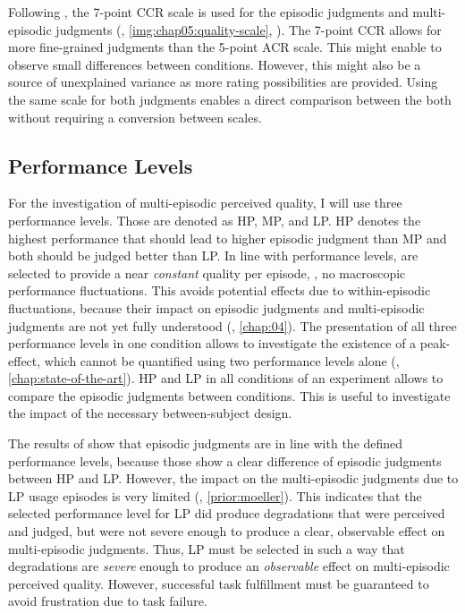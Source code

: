 Following \citet{moller_single-call_2011}, the 7-point \acf{CCR} scale is used for the episodic judgments and multi-episodic judgments (\cf, \autoref{img:chap05:quality-scale}, ).
The 7-point \ac{CCR} allows for more fine-grained judgments than the 5-point \ac{ACR} scale.
This might enable to observe small differences between conditions.
However, this might also be a source of unexplained variance as more rating possibilities are provided.
Using the same scale for both judgments enables a direct comparison between the both without requiring a conversion between scales.

\subsection{Performance Levels}
For the investigation of multi-episodic perceived quality, I will use three performance levels.
Those are denoted as \acf{HP}, \acf{MP}, and \acf{LP}.
\ac{HP} denotes the highest performance that should lead to higher episodic judgment than \ac{MP} and both should be judged better than \ac{LP}.
In line with \citet{moller_single-call_2011} performance levels, are selected to provide a near \emph{constant} quality per episode, \ie, no macroscopic performance fluctuations.
This avoids potential effects due to within-episodic fluctuations, because their impact on episodic judgments and multi-episodic judgments are not yet fully understood (\cf, \autoref{chap:04}).
The presentation of all three performance levels in one condition allows to investigate the existence of a peak-effect, which cannot be quantified using two performance levels alone (\cf, \autoref{chap:state-of-the-art}).
\ac{HP} and \ac{LP} in all conditions of an experiment allows to compare the episodic judgments between conditions.
This is useful to investigate the impact of the necessary between-subject design.

The results of \citet{moller_single-call_2011} show that episodic judgments are in line with the defined performance levels, because those show a clear difference of episodic judgments between \ac{HP} and \ac{LP}.
However, the impact on the multi-episodic judgments due to \ac{LP} usage episodes is very limited (\cf, \autoref{prior:moeller}).
This indicates that the selected performance level for \ac{LP} did produce degradations that were perceived and judged, but were not severe enough to produce a clear, observable effect on multi-episodic judgments.
Thus, \ac{LP} must be selected in such a way that degradations are \emph{severe} enough to produce an \emph{observable} effect on multi-episodic perceived quality.
However, successful task fulfillment must be guaranteed to avoid frustration due to task failure.


